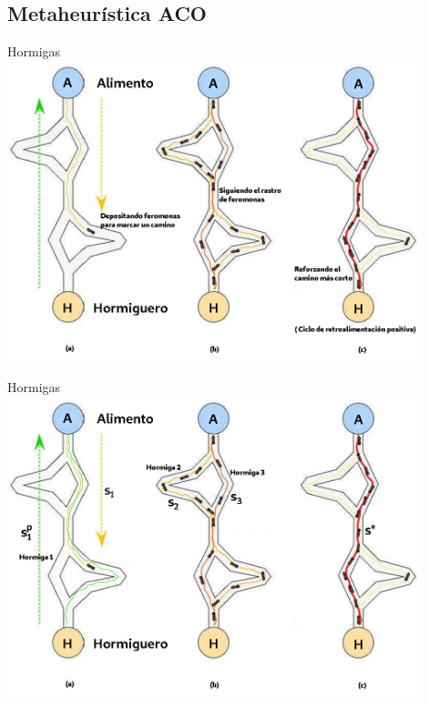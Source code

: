 \subsection{Metaheur\'istica ACO}
\begin{frame}{Hormigas}
\includegraphics[width=0.9\textwidth]{Pictures/ACO-ant.png}
\end{frame}

\begin{frame}{Hormigas}
\centering
\includegraphics[width=0.9\textwidth]{Pictures/ACO-ant-2.png}
\end{frame}

